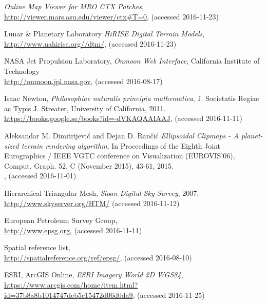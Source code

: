 \begin{thebibliography}{99}
  \emph{Online Map Viewer for MRO CTX Patches},
  \\
  \url{http://viewer.mars.asu.edu/viewer/ctx#T=0},
  (accessed 2016-11-23)
  
  Lunar \& Planetary Laboratory
  \emph{HiRISE Digital Terrain Models},
  \\
  \url{http://www.uahirise.org//dtm/},
  (accessed 2016-11-23)
  
  NASA Jet Propulsion Laboratory,
  \emph{Onmoon Web Interface},
  California Institute of Technology
  \\
  \url{http://onmoon.jpl.nasa.gov},
  (accessed 2016-08-17)

  Isaac Newton,
  \emph{Philosophiae naturalis principia mathematica},
  J. Societatis Regiae ac Typis J. Streater,
  University of California,
  2011. \\
  \url{https://books.google.se/books?id=-dVKAQAAIAAJ},
  (accessed 2016-11-11)

  Aleksandar M. Dimitrijevi\'{c} and Dejan D. Ran\v{c}i\'{c}
  \emph{Ellipsoidal Clipmaps - A planet-sized terrain rendering algorithm},
  In Proceedings of the Eighth Joint Eurographics / IEEE VGTC conference on Visualization (EUROVIS'06),
  Comput. Graph. 52, C (November 2015), 43-61,
  2015. \\
  ,
  (accessed 2016-11-01)

  Hierarchical Triangular Mesh,
  \emph{Sloan Digital Sky Survey},
  2007. \\
  \url{http://www.skyserver.org/HTM/}
  (accessed 2016-11-12)
  
  European Petroleum Survey Group,
  \\
  \url{http://www.epsg.org},
  (accessed 2016-11-11)
 
  Spatial reference list,
  \\
  \url{http://spatialreference.org/ref/epsg/},
  (accessed 2016-08-10)
  
  ESRI, ArcGIS Online,
  \emph{ESRI Imagery World 2D WGS84},
  \\
  \url{https://www.arcgis.com/home/item.html?id=37b8a8b1014747deb5e15472d06d0da9},
  (accessed 2016-11-25)
  

\end{thebibliography}
